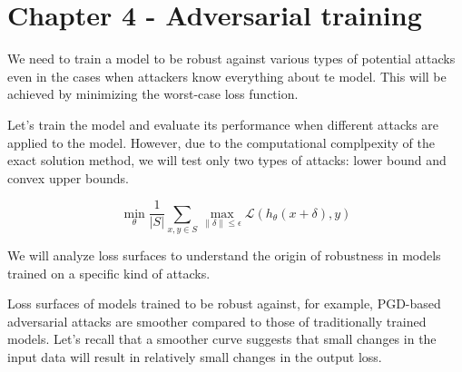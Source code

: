 \section{Chapter 4 - Adversarial training}

We need to train a model to be robust against various types of potential attacks even in the cases when attackers know everything about te model. This will be achieved by 
minimizing the worst-case loss function. 

Let's train the model and evaluate its performance when different attacks are applied to the model. 
However, due to the computational complpexity of the exact solution method, we will test only two types of attacks:
lower bound and convex upper bounds. 

\[\min_{\theta} \frac{1}{|S|} \sum_{x,y \in S} \max_{\|\delta\| \leq \epsilon} \mathcal{L}(h_{\theta}(x + \delta), y)\]

We will analyze loss surfaces to understand the origin of robustness in models trained on a specific kind of attacks.

Loss surfaces of models trained to be robust against, for example, PGD-based adversarial attacks are smoother compared 
to those of traditionally trained models. Let's recall that a smoother curve suggests that small changes in the input data will result in relatively small 
changes in the output loss.